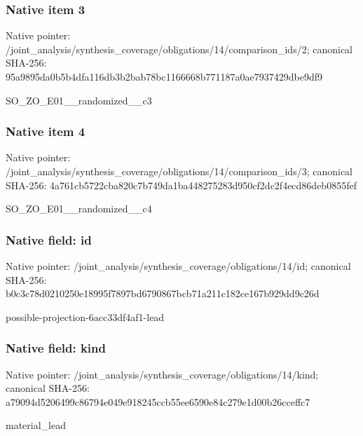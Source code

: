 \documentclass[10pt,a4paper]{article}
\begin{document}
\subsubsection{Native item 3}
Native pointer: /joint\_\allowbreak{}analysis/synthesis\_\allowbreak{}coverage/obligations/14/comparison\_\allowbreak{}ids/2; canonical SHA-256: 95a9895da0b5b4dfa116db3b2bab78bc1166668b771187a0ae7937429dbe9df9

\begingroup\raggedright\sloppy SO\_\allowbreak{}ZO\_\allowbreak{}E01\_\allowbreak{}\_\allowbreak{}randomized\_\allowbreak{}\_\allowbreak{}c3\par\endgroup

\subsubsection{Native item 4}
Native pointer: /joint\_\allowbreak{}analysis/synthesis\_\allowbreak{}coverage/obligations/14/comparison\_\allowbreak{}ids/3; canonical SHA-256: 4a761cb5722cba820c7b749da1ba448275283d950cf2dc2f4ecd86deb0855fef

\begingroup\raggedright\sloppy SO\_\allowbreak{}ZO\_\allowbreak{}E01\_\allowbreak{}\_\allowbreak{}randomized\_\allowbreak{}\_\allowbreak{}c4\par\endgroup

\subsubsection{Native field: id}
Native pointer: /joint\_\allowbreak{}analysis/synthesis\_\allowbreak{}coverage/obligations/14/id; canonical SHA-256: b0c3c78d0210250e18995f7897bd6790867bcb71a211c182ce167b929dd9c26d

\begingroup\raggedright\sloppy possible-projection-6acc33df4af1-lead\par\endgroup

\subsubsection{Native field: kind}
Native pointer: /joint\_\allowbreak{}analysis/synthesis\_\allowbreak{}coverage/obligations/14/kind; canonical SHA-256: a79094d5206499c86794e049e918245ccb55ee6590e84c279e1d00b26cceffc7

\begingroup\raggedright\sloppy material\_\allowbreak{}lead\par\endgroup
\end{document}
